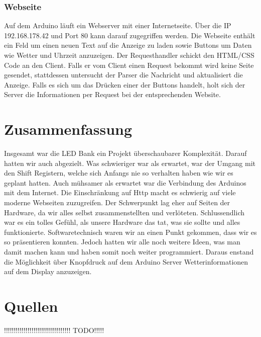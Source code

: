 \documentclass[10pt,a4paper]{article}
\begin{document}
\subsubsection{Webseite}

Auf dem Arduino läuft ein Webserver mit einer Internetseite. Über die IP 192.168.178.42 und Port 80 kann darauf zugegriffen werden. Die Webseite enthält ein Feld um einen neuen Text auf die Anzeige zu laden sowie Buttons um Daten wie Wetter und Uhrzeit anzuzeigen. Der Requesthandler schickt den HTML/CSS Code an den Client. Falls er vom Client einen Request bekommt wird keine Seite gesendet, stattdessen untersucht der Parser die Nachricht und aktualisiert die Anzeige. Falls es sich um das Drücken einer der Buttons handelt, holt sich der Server die Informationen per Request bei der entsprechenden Website. \\

\section{Zusammenfassung}

Insgesamt war die LED Bank ein Projekt überschaubarer Komplexität. Darauf hatten wir auch abgezielt. Was schwieriger war als erwartet, war der Umgang mit den Shift Registern, welche sich Anfangs nie so verhalten haben wie wir es geplant hatten. Auch mühsamer als erwartet war die Verbindung des Arduinos mit dem Internet. Die Einschränkung auf Http macht es schwierig auf viele moderne Webseiten zuzugreifen.  Der Schwerpunkt lag eher auf Seiten der Hardware, da wir alles selbst zusammenstellten und verlöteten. Schlussendlich war es ein tolles Gefühl, als unsere Hardware das tat, was sie sollte und alles funktionierte. Softwaretechnisch waren wir an einen Punkt gekommen, dass wir es so präsentieren konnten. Jedoch hatten wir alle noch weitere Ideen, was man damit machen kann und haben somit noch weiter programmiert. Daraus enstand die Möglichkeit über Knopfdruck auf dem Arduino Server Wetterinformationen auf dem Display anzuzeigen.

\section{Quellen}

!!!!!!!!!!!!!!!!!!!!!!!!!!!!!!!!!! TODO!!!!!\\
\end{document}
